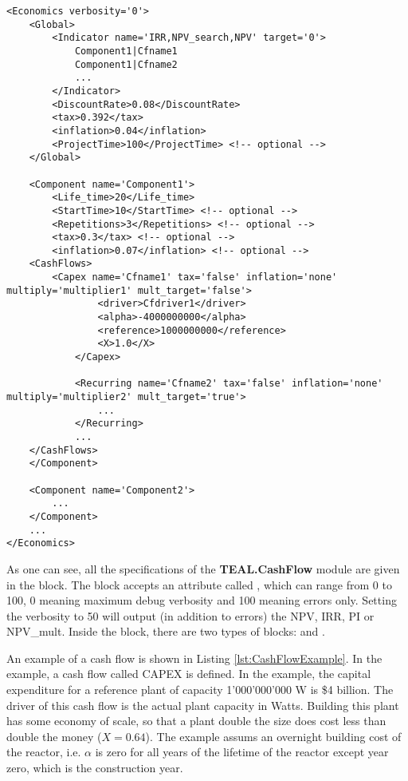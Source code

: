 \begin{lstlisting}[style=XML,morekeywords={anAttribute},caption=Economics input example., label=lst:InputExample]
<Economics verbosity='0'>
    <Global>
        <Indicator name='IRR,NPV_search,NPV' target='0'>
            Component1|Cfname1
            Component1|Cfname2
            ...
        </Indicator>
        <DiscountRate>0.08</DiscountRate>
        <tax>0.392</tax>
        <inflation>0.04</inflation>
        <ProjectTime>100</ProjectTime> <!-- optional -->
    </Global>

    <Component name='Component1'>
        <Life_time>20</Life_time>
        <StartTime>10</StartTime> <!-- optional -->
        <Repetitions>3</Repetitions> <!-- optional -->
        <tax>0.3</tax> <!-- optional -->
        <inflation>0.07</inflation> <!-- optional -->
	<CashFlows>
	    <Capex name='Cfname1' tax='false' inflation='none' multiply='multiplier1' mult_target='false'>
    	        <driver>Cfdriver1</driver>
                <alpha>-4000000000</alpha>
                <reference>1000000000</reference>
                <X>1.0</X>
            </Capex>

            <Recurring name='Cfname2' tax='false' inflation='none' multiply='multiplier2' mult_target='true'>
                ...
            </Recurring>
            ...
	</CashFlows>
    </Component>

    <Component name='Component2'>
        ...
    </Component>
    ...
</Economics>
\end{lstlisting}

As one can see, all the specifications of the \textbf{TEAL.CashFlow} module are given in the  block. The block accepts an attribute called ,
which can range from 0 to 100, 0 meaning maximum debug verbosity and 100 meaning
errors only. Setting the verbosity to 50 will output (in addition to errors) the
 NPV, IRR, PI or NPV\_mult. Inside the  block, there are two
 types of blocks:  and .

An example of a cash flow is shown in Listing \ref{lst:CashFlowExample}. In the example, a cash flow called CAPEX is defined.
In the example, the capital expenditure for a reference plant of capacity
1'000'000'000 W is \$4 billion. The driver of this cash flow is the actual plant capacity in Watts. Building this plant has some economy
of scale, so that a plant double the size does cost
less than double the money ($X=0.64$). The example assums an overnight building cost of the reactor, i.e. $\alpha$ is zero for
all years of the lifetime of the reactor except year zero, which is the construction year.

